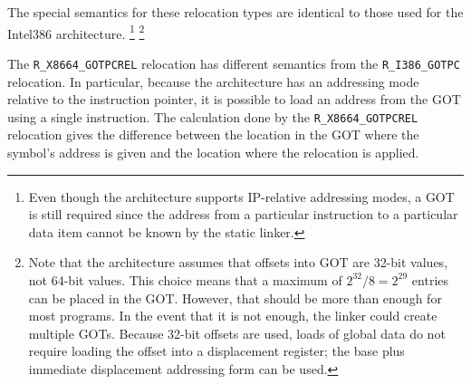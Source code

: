 The special semantics for these relocation types are identical to
those used for the Intel386 architecture.
\footnote{Even though the \xARCH architecture supports IP-relative
  addressing modes, a GOT is still required since the address from
  a particular instruction to a particular data item cannot be
  known by the static linker.}
\footnote{Note that the \xARCH architecture assumes that offsets into
  GOT are 32-bit values, not 64-bit values.  This choice means that a
  maximum of $2^{32}/8 = 2^{29}$ entries can be placed in the GOT.
  However, that should be more than enough for most programs.  In the
  event that it is not enough, the linker could create multiple GOTs.
  Because 32-bit offsets are used, loads of global data do not require
  loading the offset into a displacement register; the base plus
  immediate displacement addressing form can be used.}

The \texttt{R_X8664_GOTPCREL} relocation has different semantics from
the \texttt{R_I386_GOTPC} relocation.  In particular, because the
\xARCH architecture has an addressing mode relative to the instruction
pointer, it is possible to load an address from the GOT using a single
instruction.  The calculation done by the \texttt{R_X8664_GOTPCREL}
relocation gives the difference between the location in the GOT where
the symbol's address is given and the location where the relocation is
applied.

